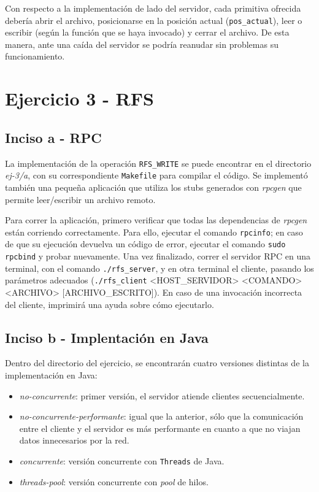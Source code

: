 Con respecto a la implementación de lado del servidor, cada primitiva ofrecida debería abrir el archivo, posicionarse en la posición actual (\texttt{pos\_actual}), leer o escribir (según la función que se haya invocado) y cerrar el archivo. De esta manera, ante una caída del servidor se podría reanudar sin problemas su funcionamiento.

\section{Ejercicio 3 - RFS}

\subsection{Inciso a - RPC}

La implementación de la operación \texttt{RFS\_WRITE} se puede encontrar en el directorio \emph{ej-3/a}, con su correspondiente \texttt{Makefile} para compilar el código. Se implementó también una pequeña aplicación que utiliza los stubs generados con \emph{rpcgen} que permite leer/escribir un archivo remoto.

Para correr la aplicación, primero verificar que todas las dependencias de \emph{rpcgen} están corriendo correctamente. Para ello, ejecutar el comando \texttt{rpcinfo}; en caso de que su ejecución devuelva un código de error, ejecutar el comando \texttt{sudo rpcbind} y probar nuevamente. Una vez finalizado, correr el servidor RPC en una terminal, con el comando \texttt{./rfs\_server}, y en otra terminal el cliente, pasando los parámetros adecuados (\texttt{./rfs\_client} <HOST\_SERVIDOR> <COMANDO> <ARCHIVO> [ARCHIVO\_ESCRITO]). En caso de una invocación incorrecta del cliente, imprimirá una ayuda sobre cómo ejecutarlo.

\subsection{Inciso b - Implentación en Java}

Dentro del directorio del ejercicio, se encontrarán cuatro versiones distintas de la implementación en Java:

\begin{itemize}
    \item \emph{no-concurrente}: primer versión, el servidor atiende clientes secuencialmente.
    \item \emph{no-concurrente-performante}: igual que la anterior, sólo que la comunicación entre el cliente y el servidor es más performante en cuanto a que no viajan datos innecesarios por la red.
    \item \emph{concurrente}: versión concurrente con \texttt{Threads} de Java.  
    \item \emph{threads-pool}: versión concurrente con \emph{pool} de hilos.  
\end{itemize}

